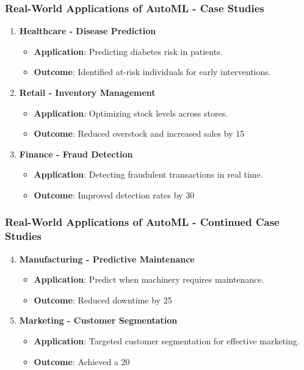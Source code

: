 \documentclass[aspectratio=169]{beamer}
\begin{document}
\begin{frame}[fragile]
  \frametitle{Real-World Applications of AutoML - Case Studies}
  \begin{enumerate}
    \item \textbf{Healthcare - Disease Prediction}
        \begin{itemize}
          \item \textbf{Application}: Predicting diabetes risk in patients.
          \item \textbf{Outcome}: Identified at-risk individuals for early interventions.
        \end{itemize}

    \item \textbf{Retail - Inventory Management}
        \begin{itemize}
          \item \textbf{Application}: Optimizing stock levels across stores.
          \item \textbf{Outcome}: Reduced overstock and increased sales by 15%
        \end{itemize}

    \item \textbf{Finance - Fraud Detection}
        \begin{itemize}
          \item \textbf{Application}: Detecting fraudulent transactions in real time.
          \item \textbf{Outcome}: Improved detection rates by 30%
        \end{itemize}
  \end{enumerate}
\end{frame}

\begin{frame}[fragile]
  \frametitle{Real-World Applications of AutoML - Continued Case Studies}
  \begin{enumerate}\setcounter{enumi}{3}
    \item \textbf{Manufacturing - Predictive Maintenance}
        \begin{itemize}
          \item \textbf{Application}: Predict when machinery requires maintenance.
          \item \textbf{Outcome}: Reduced downtime by 25%
        \end{itemize}

    \item \textbf{Marketing - Customer Segmentation}
        \begin{itemize}
          \item \textbf{Application}: Targeted customer segmentation for effective marketing.
          \item \textbf{Outcome}: Achieved a 20%
        \end{itemize}
  \end{enumerate}
\end{frame}
\end{document}
